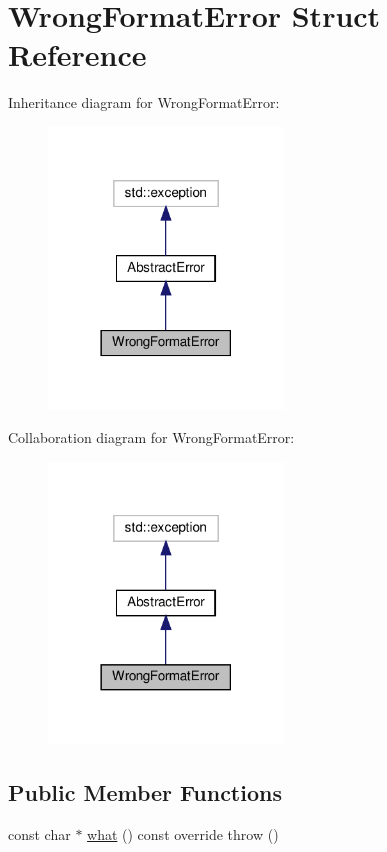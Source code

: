 \hypertarget{structWrongFormatError}{}\section{Wrong\+Format\+Error Struct Reference}
\label{structWrongFormatError}


Inheritance diagram for Wrong\+Format\+Error\+:\nopagebreak
\begin{figure}[H]
\begin{center}
\leavevmode
\includegraphics[width=177pt]{structWrongFormatError__inherit__graph}
\end{center}
\end{figure}


Collaboration diagram for Wrong\+Format\+Error\+:\nopagebreak
\begin{figure}[H]
\begin{center}
\leavevmode
\includegraphics[width=177pt]{structWrongFormatError__coll__graph}
\end{center}
\end{figure}
\subsection*{Public Member Functions}
\begin{DoxyCompactItemize}
\item 
const char $\ast$ \hyperlink{structWrongFormatError_a3c1c3f39ce135d19c7d0bb2fe8ddd3c1}{what} () const override  throw ()
\end{DoxyCompactItemize}


